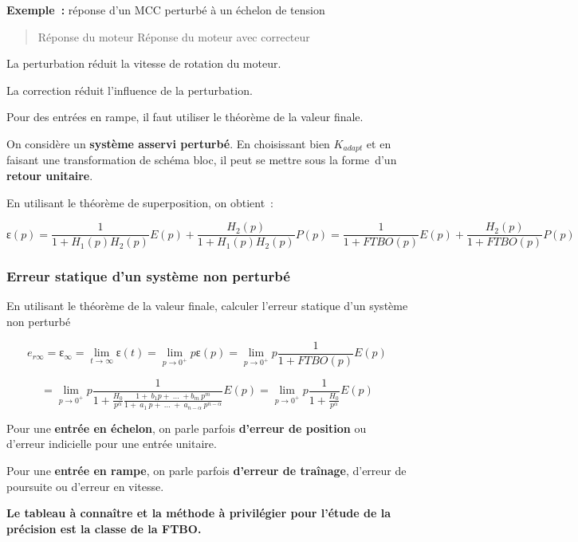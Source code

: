 \textbf{Exemple~:} réponse d'un MCC perturbé à un échelon de tension

\begin{quote}
Réponse du moteur Réponse du moteur avec correcteur
\end{quote}

La perturbation réduit la vitesse de rotation du moteur.

La correction réduit l'influence de la perturbation.

Pour des entrées en rampe, il faut utiliser le théorème de la valeur finale.

On considère un \textbf{système asservi perturbé}. En choisissant bien \(K_{adapt}\) et en faisant une transformation de schéma bloc, il peut se mettre sous la forme~d'un \textbf{retour unitaire}.

En utilisant le théorème de superposition, on obtient~:

\[ɛ(p) = \frac{1}{1 + H_{1}(p)H_{2}(p)}E(p) + \frac{H_{2}(p)}{1 + H_{1}(p)H_{2}(p)}P(p) = \frac{1}{1 + FTBO(p)}E(p) + \frac{H_{2}(p)}{1 + FTBO(p)}P(p)\]

\hypertarget{mod-erreur-statique-dun-systuxe8me-non-perturbuxe9}{%
\subsubsection{Erreur statique d'un système non perturbé}\label{mod-erreur-statique-dun-systuxe8me-non-perturbuxe9}}

En utilisant le théorème de la valeur finale, calculer l'erreur statique d'un système non perturbé

\[e_{r\infty} = ɛ_{\infty} = \lim_{t \rightarrow \infty}{ɛ(t)} = \lim_{p \rightarrow 0^{+}}{pɛ(p)} = \lim_{p \rightarrow 0^{+}}{p\frac{1}{1 + FTBO(p)}E(p)}\]

\[= \lim_{p \rightarrow 0^{+}}{p\frac{1}{1 + \frac{H_{0}}{p^{\alpha}}\frac{1 + \ b_{1}p + \ \ldots\  + b_{m}{\ p}^{m}}{1 + \ a_{1}\ p + \ \ldots\  + \ a_{n - \alpha}{\ p}^{n - \alpha}}}E(p)} = \lim_{p \rightarrow 0^{+}}{p\frac{1}{1 + \frac{H_{0}}{p^{\alpha}}}E(p)}\]

Pour une \textbf{entrée en échelon}, on parle parfois \textbf{d'erreur de position} ou d'erreur indicielle pour une entrée unitaire.

Pour une \textbf{entrée en rampe}, on parle parfois \textbf{d'erreur de traînage}, d'erreur de poursuite ou d'erreur en vitesse.

\textbf{Le tableau à connaître et la méthode à privilégier pour l'étude de la précision est la classe de la FTBO.}

